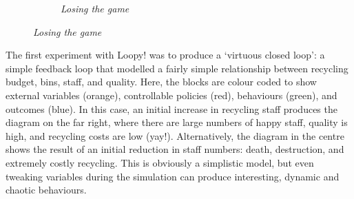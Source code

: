 \documentclass[nofonts,nols,justified,nobib]{tufte-book}
\begin{document}
\begin{figure}
\begin{subfigure}{.3\textwidth}
  \caption{\textit{Losing the game}}
  \label{small:lose}
\end{subfigure}%
\end{figure}
\vspace{0.8cm}

The first experiment with Loopy! was to produce a `virtuous closed loop': a simple feedback loop that modelled a fairly simple relationship between recycling budget, bins, staff, and quality. Here, the blocks are colour coded to show external variables (orange), controllable policies (red), behaviours (green), and outcomes (blue). In this case, an initial increase in recycling staff produces the diagram on the far right, where there are large numbers of happy staff, quality is high, and recycling costs are low (yay!). Alternatively, the diagram in the centre shows the result of an initial reduction in staff numbers: death, destruction, and extremely costly recycling. This is obviously a simplistic model, but even tweaking variables during the simulation can produce interesting, dynamic and chaotic behaviours.
\end{document}

